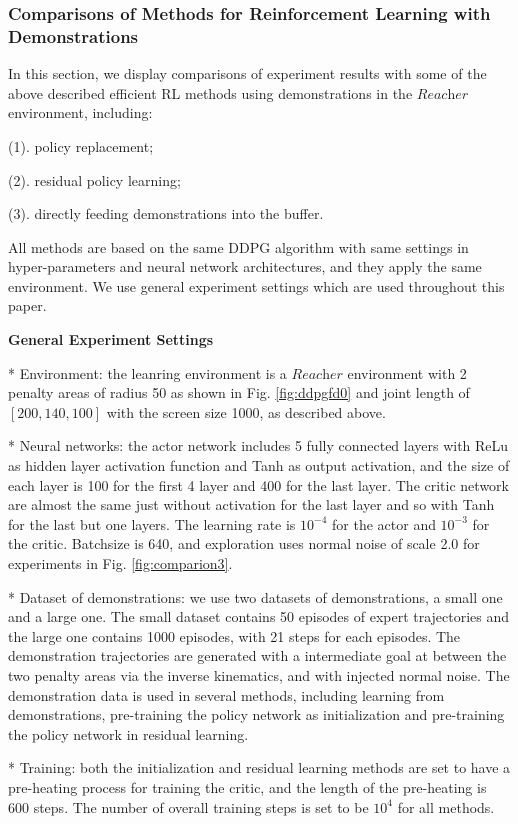 \documentclass{article}
\begin{document}
\subsubsection{Comparisons of Methods for Reinforcement Learning with Demonstrations}
In this section, we display comparisons of experiment results with some of the above described efficient RL methods using demonstrations in the $\textit{Reacher}$ environment, including:

(1). policy replacement;

(2). residual policy learning;

(3). directly feeding demonstrations into the buffer. 

All methods are based on the same DDPG algorithm with same settings in hyper-parameters and neural network architectures, and they apply the same environment. We use general experiment settings which are used throughout this paper.

\textbf{General Experiment Settings}

* Environment: the leanring environment is a $\textit{Reacher}$ environment with 2 penalty areas of radius 50 as shown in Fig. \ref{fig:ddpgfd0} and joint length of $[200, 140, 100]$ with the screen size 1000, as described above.

* Neural networks: the actor network includes 5 fully connected layers with ReLu as hidden layer activation function and Tanh as output activation, and the size of each layer is 100 for the first 4 layer and 400 for the last layer. The critic network are almost the same just without activation for the last layer and so with Tanh for the last but one layers. The learning rate is $10^{-4}$ for the actor and $10^{-3}$ for the critic. Batchsize is 640, and exploration uses normal noise of scale 2.0 for experiments in Fig. \ref{fig:comparion3}.

* Dataset of demonstrations: we use two datasets of demonstrations, a small one and a large one. The small dataset contains 50 episodes of expert trajectories and the large one contains 1000 episodes, with 21 steps for each episodes. The demonstration trajectories are generated with a intermediate goal at between the two penalty areas via the inverse kinematics, and with injected normal noise. The demonstration data is used in several methods, including learning from demonstrations, pre-training the policy network as initialization and pre-training the policy network in residual learning.

* Training: both the initialization and residual learning methods are set to have a pre-heating process for training the critic, and the length of the pre-heating is 600 steps. The number of overall training steps is set to be $10^4$ for all methods.
\end{document}

